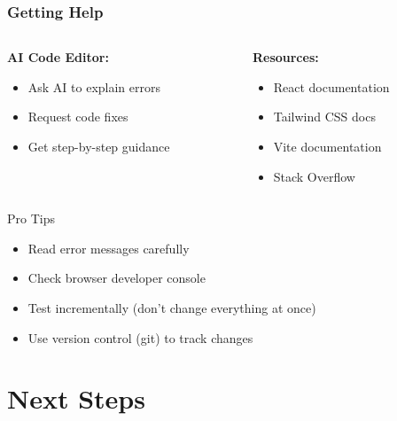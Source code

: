 \documentclass[aspectratio=169]{beamer}
\begin{document}
\begin{frame}
\frametitle{Getting Help}
\begin{columns}
\begin{column}{0.5\textwidth}
\textbf{AI Code Editor:}
\begin{itemize}
\item Ask AI to explain errors
\item Request code fixes
\item Get step-by-step guidance
\end{itemize}
\end{column}
\begin{column}{0.5\textwidth}
\textbf{Resources:}
\begin{itemize}
\item React documentation
\item Tailwind CSS docs
\item Vite documentation
\item Stack Overflow
\end{itemize}
\end{column}
\end{columns}

\begin{alertblock}{Pro Tips}
\begin{itemize}
\item Read error messages carefully
\item Check browser developer console
\item Test incrementally (don't change everything at once)
\item Use version control (git) to track changes
\end{itemize}
\end{alertblock}
\end{frame}

\section{Next Steps}
\end{document}
